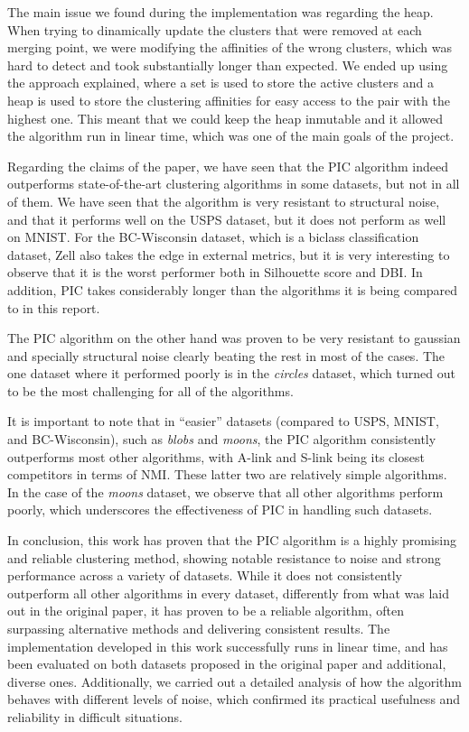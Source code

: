 \documentclass[
	10pt,
	parskip=half-,	
	paper=a4,
	english
	]{scrartcl}
\begin{document}
The main issue we found during the implementation was regarding the heap. When trying to dinamically update the clusters that were removed at each merging point, we were modifying the affinities of the wrong clusters, which was hard to detect and took substantially longer than expected. We ended up using the approach explained, where a set is used to store the active clusters and a heap is used to store the clustering affinities for easy access to the pair with the highest one. This meant that we could keep the heap inmutable and it allowed the algorithm run in linear time, which was one of the main goals of the project.

Regarding the claims of the paper, we have seen that the PIC algorithm indeed outperforms state-of-the-art clustering algorithms in some datasets, but not in all of them. We have seen that the algorithm is very resistant to structural noise, and that it performs well on the USPS dataset, but it does not perform as well on MNIST. For the BC-Wisconsin dataset, which is a biclass classification dataset, Zell also takes the edge in external metrics, but it is very interesting to observe that it is the worst performer both in Silhouette score and DBI. In addition, PIC takes considerably longer than the algorithms it is being compared to in this report. 

The PIC algorithm on the other hand was proven to be very resistant to gaussian and specially structural noise clearly beating the rest in most of the cases. The one dataset where it performed poorly is in the \textit{circles} dataset, which turned out to be the most challenging for all of the algorithms.

It is important to note that in ``easier'' datasets (compared to USPS, MNIST, and BC-Wisconsin), such as \textit{blobs} and \textit{moons}, the PIC algorithm consistently outperforms most other algorithms, with A-link and S-link being its closest competitors in terms of NMI. These latter two are relatively simple algorithms. In the case of the \textit{moons} dataset, we observe that all other algorithms perform poorly, which underscores the effectiveness of PIC in handling such datasets.

In conclusion, this work has proven that the PIC algorithm is a highly promising and reliable clustering method, showing notable resistance to noise and strong performance across a variety of datasets. While it does not consistently outperform all other algorithms in every dataset, differently from what was laid out in the original paper, it has proven to be a reliable algorithm, often surpassing alternative methods and delivering consistent results. The implementation developed in this work successfully runs in linear time, and has been evaluated on both datasets proposed in the original paper and additional, diverse ones. Additionally, we carried out a detailed analysis of how the algorithm behaves with different levels of noise, which confirmed its practical usefulness and reliability in difficult situations.
\end{document}
